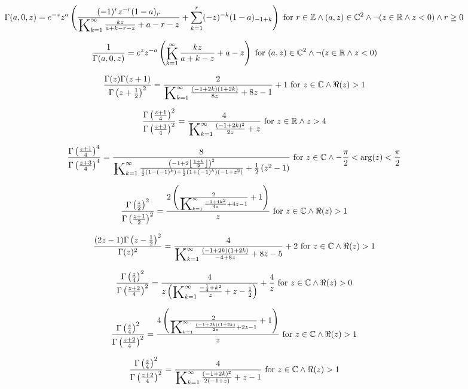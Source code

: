 \documentclass{article}
\newcommand{\bigK}{\mathop{\raisebox{-5pt}{\huge K}}}
\begin{document}
\[\Gamma (a,0,z)=e^{-z} z^a \left(\frac{(-1)^r z^{-r} (1-a)_r}{\bigK_{k=1}^{\infty}\frac{k z}{a+k-r-z}+a-r-z}+\sum _{k=1}^r (-z)^{-k} (1-a)_{-1+k}\right)\text{ for }r\in \mathbb{Z}\land (a,z)\in \mathbb{C}^2\land \neg (z\in \mathbb{R}\land z<0)\land r\geq 0\] 

\[\frac{1}{\Gamma (a,0,z)}=e^z z^{-a} \left(\bigK_{k=1}^{\infty}\frac{k z}{a+k-z}+a-z\right)\text{ for }(a,z)\in \mathbb{C}^2\land \neg (z\in \mathbb{R}\land z<0)\] 

\[\frac{\Gamma (z) \Gamma (z+1)}{\Gamma \left(z+\frac{1}{2}\right)^2}=\frac{2}{\bigK_{k=1}^{\infty}\frac{(-1+2 k) (1+2 k)}{8 z}+8 z-1}+1\text{ for }z\in \mathbb{C}\land \Re(z)>1\] 

\[\frac{\Gamma \left(\frac{z+1}{4}\right)^2}{\Gamma \left(\frac{z+3}{4}\right)^2}=\frac{4}{\bigK_{k=1}^{\infty}\frac{(-1+2 k)^2}{2 z}+z}\text{ for }z\in \mathbb{R}\land z>4\] 

\[\frac{\Gamma \left(\frac{z+1}{4}\right)^4}{\Gamma \left(\frac{z+3}{4}\right)^4}=\frac{8}{\bigK_{k=1}^{\infty}\frac{\left(-1+2 \left\lfloor \frac{1+k}{2}\right\rfloor \right)^2}{\frac{1}{2} \left(1-(-1)^k\right)+\frac{1}{2} \left(1+(-1)^k\right) \left(-1+z^2\right)}+\frac{1}{2} \left(z^2-1\right)}\text{ for }z\in \mathbb{C}\land -\frac{\pi }{2}<\arg (z)<\frac{\pi }{2}\] 

\[\frac{\Gamma \left(\frac{z}{2}\right)^2}{\Gamma \left(\frac{z+1}{2}\right)^2}=\frac{2 \left(\frac{2}{\bigK_{k=1}^{\infty}\frac{-1+4 k^2}{4 z}+4 z-1}+1\right)}{z}\text{ for }z\in \mathbb{C}\land \Re(z)>1\] 

\[\frac{(2 z-1) \Gamma \left(z-\frac{1}{2}\right)^2}{\Gamma (z)^2}=\frac{4}{\bigK_{k=1}^{\infty}\frac{(-1+2 k) (1+2 k)}{-4+8 z}+8 z-5}+2\text{ for }z\in \mathbb{C}\land \Re(z)>1\] 

\[\frac{\Gamma \left(\frac{z}{4}\right)^2}{\Gamma \left(\frac{z+2}{4}\right)^2}=\frac{4}{z \left(\bigK_{k=1}^{\infty}\frac{-\frac{1}{4}+k^2}{z}+z-\frac{1}{2}\right)}+\frac{4}{z}\text{ for }z\in \mathbb{C}\land \Re(z)>0\] 

\[\frac{\Gamma \left(\frac{z}{4}\right)^2}{\Gamma \left(\frac{z+2}{4}\right)^2}=\frac{4 \left(\frac{2}{\bigK_{k=1}^{\infty}\frac{(-1+2 k) (1+2 k)}{2 z}+2 z-1}+1\right)}{z}\text{ for }z\in \mathbb{C}\land \Re(z)>1\] 

\[\frac{\Gamma \left(\frac{z}{4}\right)^2}{\Gamma \left(\frac{z+2}{4}\right)^2}=\frac{4}{\bigK_{k=1}^{\infty}\frac{(-1+2 k)^2}{2 (-1+z)}+z-1}\text{ for }z\in \mathbb{C}\land \Re(z)>1\] 
\end{document}
